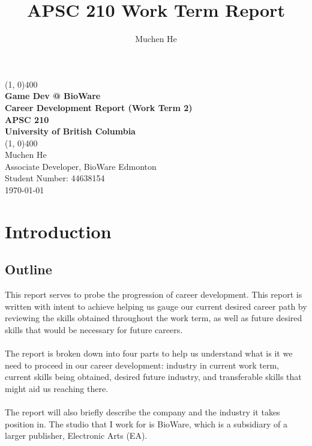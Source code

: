 \documentclass[10pt,letterpaper]{article}
\author{Muchen He}
\title{APSC 210 Work Term Report}
\begin{document}
\begin{titlepage}
	\begin{center}
		\vspace*{3in}
		\line(1, 0){400}\\
		\Huge{\textbf{Game Dev @ BioWare}}\\[0.2cm]
		\large{\textbf{Career Development Report (Work Term 2)}}\\[1cm]
		\Large{\textbf{APSC 210}}\\
		\textbf{University of British Columbia}\\
		\line(1, 0){400}\\
		\vfill
		\Large{Muchen He}\\
		\large{Associate Developer, BioWare Edmonton}\\
		Student Number: 44638154\\

		\today \\
	\end{center}
\end{titlepage}

\setcounter{secnumdepth}{3}
\tableofcontents
\thispagestyle{empty}
\clearpage

\thispagestyle{empty}
\listoffigures
\listoftables
\newpage

\setcounter{page}{1}
\setcounter{section}{-1}

\section{Introduction}\label{introduction}

\subsection{Outline}\label{introduction-outline}

This report serves to probe the progression of career development. This report is written with intent to achieve helping us gauge our current desired career path by reviewing the skills obtained throughout the work term, as well as future desired skills that would be necessary for future careers. \\
\\
The report is broken down into four parts to help us understand what is it we need to proceed in our career development: industry in current work term, current skills being obtained, desired future industry, and transferable skills that might aid us reaching there.\\
\\
The report will also briefly describe the company and the industry it takes position in. The studio that I work for is BioWare, which is a subsidiary of a larger publisher, Electronic Arts (EA).
\end{document}
